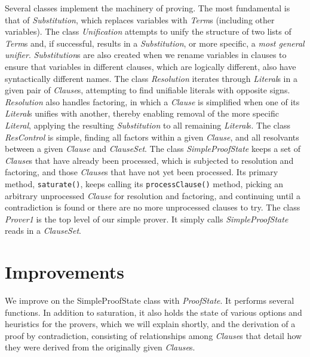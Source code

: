 \documentclass{llncs}
\begin{document}
Several classes implement the machinery of proving.  The most
fundamental is that of \emph{Substitution}, which replaces variables
with \emph{Term}s (including other variables).  The class
\emph{Unification} attempts to unify the structure of two lists of
\emph{Term}s and, if successful, results in a \emph{Substitution}, or
more specific, a \emph{most general unifier}.  \emph{Substitution}s
are also created when we rename variables in clauses to ensure that
variables in different clauses, which are logically different, also
have syntactically different names.
The class \emph{Resolution}
iterates through \emph{Literal}s in a given pair of \emph{Clause}s,
attempting to find unifiable literals with opposite signs.
\emph{Resolution} also handles factoring, in which a \emph{Clause} is
simplified when one of its \emph{Literal}s unifies with another,
thereby enabling removal of the more specific \emph{Literal}, applying
the resulting \emph{Substitution} to all remaining \emph{Literal}s.
The class \emph{ResControl} is simple, finding all factors within a
given \emph{Clause}, and all resolvants between a given \emph{Clause}
and \emph{ClauseSet}.  The class \emph{SimpleProofState} keeps a set
of \emph{Clause}s that have already been processed, which is subjected
to resolution and factoring, and those \emph{Clause}s that have not
yet been processed.  Its primary method, \texttt{saturate()}, keeps
calling its \texttt{processClause()} method, picking an arbitrary
unprocessed \emph{Clause} for resolution and factoring, and continuing
until a contradiction is found or there are no more unprocessed
clauses to try.  The class \emph{Prover1} is the top level of our
simple prover.  It simply calls \emph{SimpleProofState} reads in a
\emph{ClauseSet}.

\section{Improvements}

We improve on the SimpleProofState class with \emph{ProofState}. It performs
several functions.  In addition to saturation, it also holds the state
of various options and heuristics for the provers, which we will
explain shortly, and the derivation of a proof by contradiction,
consisting of relationships among \emph{Clause}s that detail how they were
derived from the originally given \emph{Clause}s.
\end{document}
